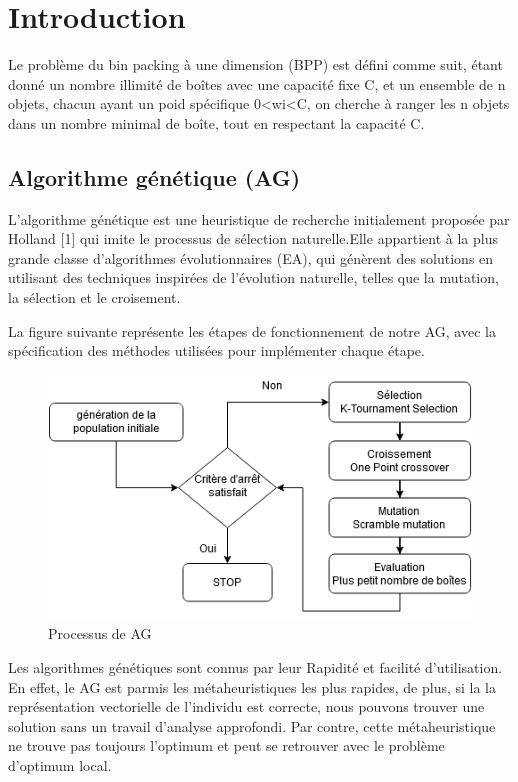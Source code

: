 \documentclass[preprint,12pt]{elsarticle}
\begin{document}

\section{Introduction}
\label{S:1}

Le problème du bin packing à une dimension (BPP) est défini comme suit, étant donné un nombre illimité de boîtes avec une capacité fixe C, et un ensemble de n objets, chacun ayant un poid spécifique 0<wi<C, on cherche à ranger les n objets dans un nombre minimal de boîte, tout en respectant la capacité C. 


\subsection{Algorithme génétique (AG)}
L’algorithme génétique est une heuristique de recherche initialement proposée par Holland [1] qui imite le processus de sélection naturelle.Elle appartient à la plus grande classe d'algorithmes évolutionnaires (EA), qui génèrent des solutions en utilisant des techniques inspirées de l'évolution naturelle, telles que la mutation, la sélection et le croisement.

La figure suivante représente les étapes de fonctionnement de notre AG, avec la spécification des méthodes utilisées pour implémenter chaque étape. 

\begin{figure}[h]
    \includegraphics[width=\linewidth]{./figures/AG schema.png}
    \caption{Processus de AG }
    \label{fig:agschema}
\end{figure}
Les algorithmes génétiques sont connus par leur Rapidité et facilité d’utilisation. 
En effet, le AG est parmis les métaheuristiques les plus rapides, de plus, si la la représentation vectorielle de l'individu est correcte, nous pouvons trouver une solution sans un travail d'analyse approfondi. Par contre, cette métaheuristique ne trouve pas toujours l’optimum et peut se retrouver avec le problème d’optimum local. 
\end{document}
